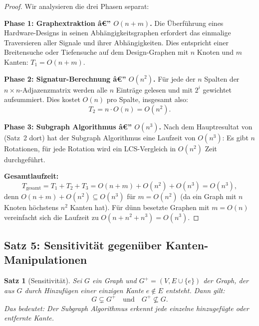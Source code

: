 ﻿\documentclass[12pt,a4paper]{report}
\newtheorem{theorem}{Satz}[section]
\begin{document}
\begin{proof}
Wir analysieren die drei Phasen separat:

\textbf{Phase 1: Graphextraktion â€” $O(n + m)$.}
Die Überführung eines Hardware-Designs in seinen Abhängigkeitsgraphen erfordert das einmalige Traversieren aller Signale und ihrer Abhängigkeiten. Dies entspricht einer Breitensuche oder Tiefensuche auf dem Design-Graphen mit $n$ Knoten und $m$ Kanten: $T_1 = O(n + m)$.

\textbf{Phase 2: Signatur-Berechnung â€” $O(n^2)$.}
Für jede der $n$ Spalten der $n \times n$-Adjazenzmatrix werden alle $n$ Einträge gelesen und mit $2^i$ gewichtet aufsummiert. Dies kostet $O(n)$ pro Spalte, insgesamt also:
\[
T_2 = n \cdot O(n) = O(n^2).
\]

\textbf{Phase 3: Subgraph Algorithmus â€” $O(n^3)$.}
Nach dem Hauptresultat von \cite{subgraph2026} (Satz~2 dort) hat der Subgraph Algorithmus eine Laufzeit von $O(n^3)$: Es gibt $n$ Rotationen, für jede Rotation wird ein LCS-Vergleich in $O(n^2)$ Zeit durchgeführt.

\textbf{Gesamtlaufzeit:}
\[
T_{\mathrm{gesamt}} = T_1 + T_2 + T_3 = O(n + m) + O(n^2) + O(n^3) = O(n^3),
\]
denn $O(n + m) + O(n^2) \subseteq O(n^3)$ für $m = O(n^2)$ (da ein Graph mit $n$ Knoten höchstens $n^2$ Kanten hat). Für dünn besetzte Graphen mit $m = O(n)$ vereinfacht sich die Laufzeit zu $O(n + n^2 + n^3) = O(n^3)$.
\end{proof}

\subsection{Satz 5: Sensitivität gegenüber Kanten-Manipulationen}

\begin{theorem}[Sensitivität]
\label{thm:sensitivitaet}
Sei $G$ ein Graph und $G^+ = (V, E \cup \{e\})$ der Graph, der aus $G$ durch Hinzufügen einer einzigen Kante $e \notin E$ entsteht. Dann gilt:
\[
G \subsetneq G^+ \quad \text{und} \quad G^+ \not\subseteq G.
\]
Das bedeutet: Der Subgraph Algorithmus erkennt jede einzelne hinzugefügte oder entfernte Kante.
\end{theorem}
\end{document}
